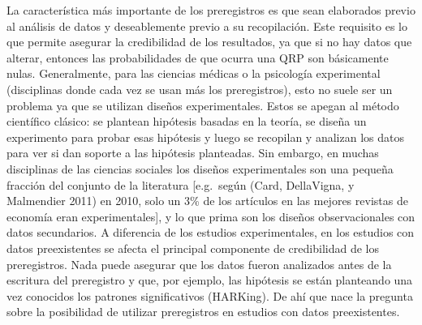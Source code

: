\documentclass[
  spanish,
  letterpaper,
  DIV=11,
  numbers=noendperiod]{scrreprt}
\begin{document}
La característica más importante de los preregistros es que sean
elaborados previo al análisis de datos y deseablemente previo a su
recopilación. Este requisito es lo que permite asegurar la credibilidad
de los resultados, ya que si no hay datos que alterar, entonces las
probabilidades de que ocurra una QRP son básicamente nulas.
Generalmente, para las ciencias médicas o la psicología experimental
(disciplinas donde cada vez se usan más los preregistros), esto no suele
ser un problema ya que se utilizan diseños experimentales. Estos se
apegan al método científico clásico: se plantean hipótesis basadas en la
teoría, se diseña un experimento para probar esas hipótesis y luego se
recopilan y analizan los datos para ver si dan soporte a las hipótesis
planteadas. Sin embargo, en muchas disciplinas de las ciencias sociales
los diseños experimentales son una pequeña fracción del conjunto de la
literatura {[}e.g.~según (Card, DellaVigna, y Malmendier 2011) en 2010,
solo un 3\% de los artículos en las mejores revistas de economía eran
experimentales{]}, y lo que prima son los diseños observacionales con
datos secundarios. A diferencia de los estudios experimentales, en los
estudios con datos preexistentes se afecta el principal componente de
credibilidad de los preregistros. Nada puede asegurar que los datos
fueron analizados antes de la escritura del preregistro y que, por
ejemplo, las hipótesis se están planteando una vez conocidos los
patrones significativos (HARKing). De ahí que nace la pregunta sobre la
posibilidad de utilizar preregistros en estudios con datos
preexistentes.
\end{document}
